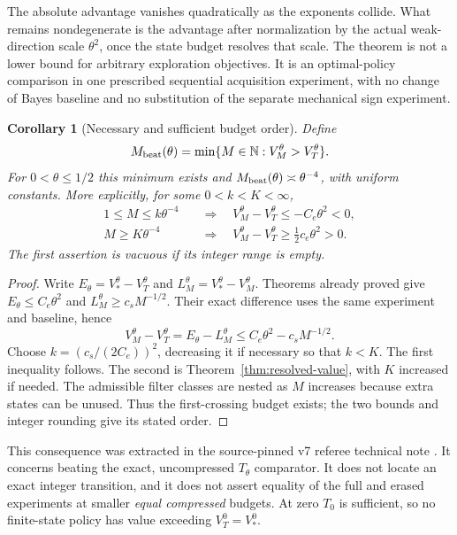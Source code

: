 \documentclass[11pt]{amsart}
\newtheorem{corollary}[theorem]{Corollary}
\theoremstyle{definition}\newtheorem{definition}[theorem]{Definition}
\theoremstyle{remark}\newtheorem{remark}[theorem]{Remark}
\begin{document}
The absolute advantage vanishes quadratically as the exponents collide.
What remains nondegenerate is the advantage after normalization by the
actual weak-direction scale $\theta^2$, once the state budget resolves
that scale. The theorem is not a lower bound for arbitrary exploration
objectives. It is an optimal-policy comparison in one prescribed
sequential acquisition experiment, with no change of Bayes baseline and
no substitution of the separate mechanical sign experiment.


\begin{corollary}[Necessary and sufficient budget order]\label{cor:necessary-budget}
Define
\[
 M_{\rm beat}(\theta)=\min\{M\in\mathbb N:V_M^\theta>V_T^\theta\}.
\]
For $0<\theta\le1/2$ this minimum exists and
$M_{\rm beat}(\theta)\asymp\theta^{-4}$, with uniform constants.
More explicitly, for some $0<k<K<\infty$,
\[
 \begin{aligned}
 1\le M\le k\theta^{-4}&\quad\Longrightarrow\quad
 V_M^\theta-V_T^\theta\le-C_e\theta^2<0,\\
 M\ge K\theta^{-4}&\quad\Longrightarrow\quad
 V_M^\theta-V_T^\theta\ge\tfrac12c_e\theta^2>0.
 \end{aligned}
\]
The first assertion is vacuous if its integer range is empty.
\end{corollary}
\begin{proof}
Write $E_\theta=V_*^\theta-V_T^\theta$ and
$L_M^\theta=V_*^\theta-V_M^\theta$. Theorems already proved give
$E_\theta\le C_e\theta^2$ and $L_M^\theta\ge c_sM^{-1/2}$.
Their exact difference uses the same experiment and baseline, hence
\[
 V_M^\theta-V_T^\theta=E_\theta-L_M^\theta
             \le C_e\theta^2-c_sM^{-1/2}.
\]
Choose $k=(c_s/(2C_e))^2$, decreasing it if necessary so that $k<K$.
The first inequality follows. The second is
Theorem~\ref{thm:resolved-value}, with $K$ increased if needed.
The admissible filter classes are nested as $M$ increases because extra
states can be unused. Thus the first-crossing budget exists; the two
bounds and integer rounding give its stated order.
\end{proof}

This consequence was extracted in the source-pinned v7 referee technical
note \cite{A1v7note}. It concerns beating the exact, uncompressed
$T_\theta$ comparator. It does not locate an exact integer transition,
and it does not assert equality of the full and erased experiments at
smaller \emph{equal compressed} budgets. At zero $T_0$ is sufficient,
so no finite-state policy has value exceeding $V_T^0=V_*^0$.
\end{document}
